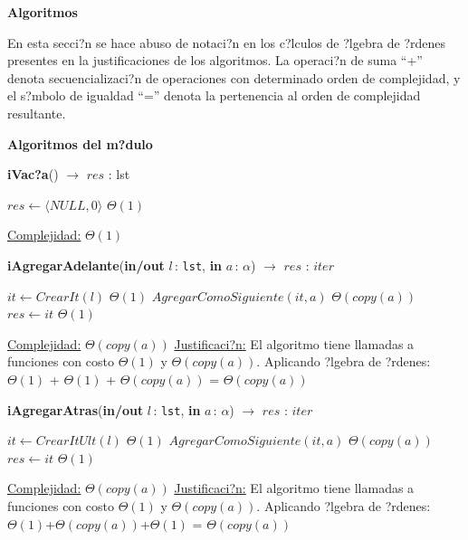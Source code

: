 \documentclass[a4paper,10pt]{article}
\let\TipoVariable=\texttt
\let\ModificadorArgumento=\textbf
\newcommand{\In}[2]{\ModificadorArgumento{in} \ensuremath{#1}\,: \TipoVariable{#2}\xspace}
\newcommand{\Inout}[2]{\ModificadorArgumento{in/out} \ensuremath{#1}\,: \TipoVariable{#2}\xspace}
\newenvironment{Algoritmos}{%
  \vspace*{2ex}%
  \noindent\textbf{\Large Algoritmos}%
  \vspace*{2ex}%
}{}
\newcommand{\Titulo}[1]{
  \vspace*{1ex}\par\noindent\textbf{\large #1}\par
}
\begin{document}
\begin{Algoritmos}

En esta secci?n se hace abuso de notaci?n en los c?lculos de ?lgebra de ?rdenes presentes en la justificaciones de los algoritmos. La operaci?n de suma ``+'' denota secuencializaci?n de operaciones con determinado orden de complejidad, y el s?mbolo de igualdad ``='' denota la pertenencia al orden de complejidad resultante.

\medskip
	
 \Titulo{Algoritmos del m?dulo}
  	\medskip
  
\begin{algorithm}[H]{\textbf{iVac?a}() $\to$ $res$ : lst}
    	\begin{algorithmic}[1]
			 \State $res \gets \langle NULL, 0 \rangle$ \Comment $\Theta(1)$

			\medskip
			\Statex \underline{Complejidad:} $\Theta(1)$
    	\end{algorithmic}
\end{algorithm}

\begin{algorithm}[H]{\textbf{iAgregarAdelante}(\Inout{l}{lst}, \In{a}{$\alpha$}) $\to$ $res$ : $iter$}
	\begin{algorithmic}
			 \State $it \gets CrearIt(l)$ 				\Comment $\Theta(1)$
			 \State $AgregarComoSiguiente(it, a)$	\Comment $\Theta(copy(a))$
			 \State $res \gets it$					\Comment $\Theta(1)$

			\medskip
			\Statex \underline{Complejidad:} $\Theta(copy(a))$
			\Statex \underline{Justificaci?n:} El algoritmo tiene llamadas a funciones con costo $\Theta(1)$ y $\Theta(copy(a))$. Aplicando ?lgebra de ?rdenes: \\ $\Theta(1)$ + $\Theta(1)$ + $\Theta(copy(a))$ = $\Theta(copy(a))$
    	\end{algorithmic}
\end{algorithm}


\begin{algorithm}[H]{\textbf{iAgregarAtras}(\Inout{l}{lst}, \In{a}{$\alpha$}) $\to$ $res$ : $iter$}
	\begin{algorithmic}[1]
			 \State $it \gets CrearItUlt(l)$	\Comment $\Theta(1)$
			 \State $AgregarComoSiguiente(it, a)$	\Comment $\Theta(copy(a))$
			 \State $res \gets it$	\Comment $\Theta(1)$

			\medskip
			\Statex \underline{Complejidad:} $\Theta(copy(a))$
			\Statex \underline{Justificaci?n:} El algoritmo tiene llamadas a funciones con costo $\Theta(1)$ y $\Theta(copy(a))$. Aplicando ?lgebra de ?rdenes:  $\Theta(1)$+$\Theta(copy(a))$+$\Theta(1)$ =  $\Theta(copy(a))$
    	\end{algorithmic}
\end{algorithm}
	


\end{Algoritmos}
\end{document}
